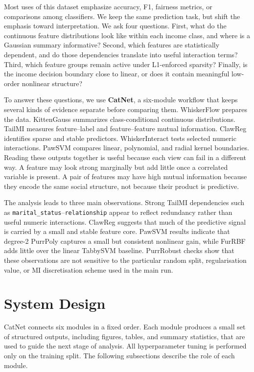 \documentclass[11pt]{article}
\begin{document}
Most uses of this dataset emphasize accuracy, F1, fairness metrics, or comparisons among classifiers. We keep the same prediction task, but shift the emphasis toward interpretation. We ask four questions. First, what do the continuous feature distributions look like within each income class, and where is a Gaussian summary informative? Second, which features are statistically dependent, and do those dependencies translate into useful interaction terms? Third, which feature groups remain active under L1-enforced sparsity? Finally, is the income decision boundary close to linear, or does it contain meaningful low-order nonlinear structure?

To answer these questions, we use \textbf{CatNet}, a six-module workflow that keeps several kinds of evidence separate before comparing them. WhiskerFlow prepares the data. KittenGauss summarizes class-conditional continuous distributions. TailMI measures feature--label and feature--feature mutual information. ClawReg identifies sparse and stable predictors. WhiskerInteract tests selected numeric interactions. PawSVM compares linear, polynomial, and radial kernel boundaries. Reading these outputs together is useful because each view can fail in a different way. A feature may look strong marginally but add little once a correlated variable is present. A pair of features may have high mutual information because they encode the same social structure, not because their product is predictive.

The analysis leads to three main observations. Strong TailMI dependencies such as \texttt{marital\_status}--\texttt{relationship} appear to reflect redundancy rather than useful numeric interactions. ClawReg suggests that much of the predictive signal is carried by a small and stable feature core. PawSVM results indicate that degree-2 PurrPoly captures a small but consistent nonlinear gain, while FurRBF adds little over the linear TabbySVM baseline. PurrRobust checks show that these observations are not sensitive to the particular random split, regularisation value, or MI discretisation scheme used in the main run.

\section{System Design}
\label{sec:sysdesign}

CatNet connects six modules in a fixed order. Each module produces a small set of structured outputs, including figures, tables, and summary statistics, that are used to guide the next stage of analysis. All hyperparameter tuning is performed only on the training split. The following subsections describe the role of each module.
\end{document}
